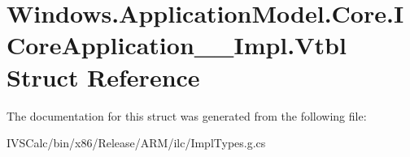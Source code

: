 \hypertarget{struct_windows_1_1_application_model_1_1_core_1_1_i_core_application_____impl_1_1_vtbl}{}\section{Windows.\+Application\+Model.\+Core.\+I\+Core\+Application\+\_\+\+\_\+\+Impl.\+Vtbl Struct Reference}
\label{struct_windows_1_1_application_model_1_1_core_1_1_i_core_application_____impl_1_1_vtbl}


The documentation for this struct was generated from the following file\+:\begin{DoxyCompactItemize}
\item 
I\+V\+S\+Calc/bin/x86/\+Release/\+A\+R\+M/ilc/Impl\+Types.\+g.\+cs\end{DoxyCompactItemize}
